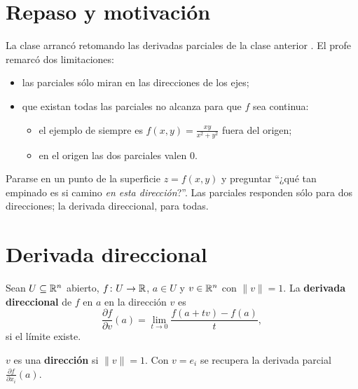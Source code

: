 \documentclass{classmer}
\begin{document}

\section{Repaso y motivación }

La clase arrancó retomando las derivadas parciales de la clase anterior
. El profe remarcó dos limitaciones:
\begin{itemize}
  \item las parciales sólo miran en las direcciones de los ejes;
  \item que existan todas las parciales no alcanza para que $f$ sea continua:
  \begin{itemize}
    \item el ejemplo de siempre es $f(x,y)=\frac{xy}{x^2+y^2}$ fuera del origen;
    \item en el origen las dos parciales valen $0$.
  \end{itemize}
\end{itemize}

\begin{intuicion}
Pararse en un punto de la superficie $z=f(x,y)$ y preguntar ``¿qué tan empinado
es si camino \emph{en esta dirección}?''. Las parciales responden sólo para dos
direcciones; la derivada direccional, para todas.
\end{intuicion}

\section{Derivada direccional }

\begin{definicion}
Sean $U\subseteq\mathbb{R}^n$ abierto, $f\colon U\to\mathbb{R}$, $a\in U$ y $v\in\mathbb{R}^n$ con
$\|v\|=1$. La \textbf{derivada direccional} de $f$ en $a$ en la dirección $v$ es
\[
  \frac{\partial f}{\partial v}(a)=\lim_{t\to 0}\frac{f(a+tv)-f(a)}{t},
\]
si el límite existe.
\end{definicion}

\begin{definicion}
$v$ es una \textbf{dirección} si $\|v\|=1$. Con $v=e_i$ se recupera la derivada
parcial $\frac{\partial f}{\partial x_i}(a)$.
\end{definicion}
\end{document}
